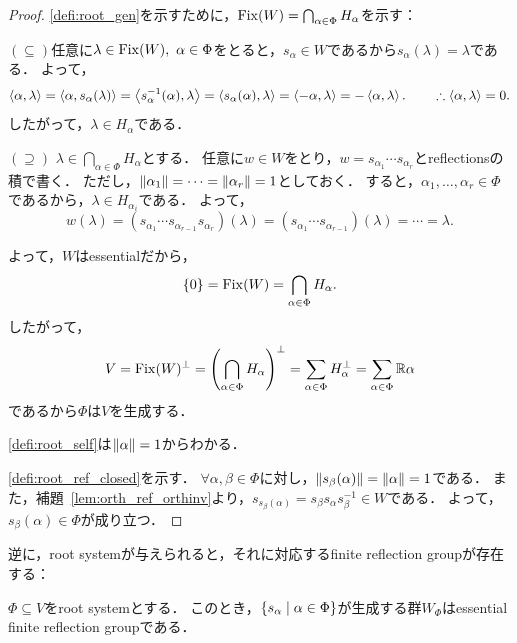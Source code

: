\begin{proof}
  \ref{defi:root_gen}を示すために，$\operatorname{Fix} (W) = \bigcap_{\alpha \in \Phi} H_\alpha$を示す：

  $(\subseteq)$任意に$\lambda \in \operatorname{Fix}(W),\ \alpha \in \Phi$をとると，$s_\alpha \in W$であるから$s_\alpha(\lambda) = \lambda$である．
  よって，
  \begin{equation}
    \left\langle \alpha, \lambda \right\rangle
    = \left\langle \alpha, s_\alpha(\lambda) \right\rangle
    = \left\langle s_\alpha^{-1}(\alpha), \lambda \right\rangle
    = \left\langle s_\alpha(\alpha), \lambda \right\rangle
    = \left\langle -\alpha, \lambda \right\rangle
    = -\left\langle \alpha, \lambda \right\rangle.
    \qquad \therefore \left\langle \alpha, \lambda \right\rangle = 0.
  \end{equation}
  したがって，$\lambda \in H_\alpha$である．

  $(\supseteq)$ $\lambda \in \bigcap_{\alpha \in \Phi} H_\alpha$とする．
  任意に$w \in W$をとり，$w = s_{\alpha_1} \cdots s_{\alpha_r}$とreflectionsの積で書く．
  ただし，$\left\| \alpha_1 \right\| = \cdots = \left\| \alpha_r \right\| = 1$としておく．
  すると，$\alpha_1, \ldots, \alpha_r \in \Phi$であるから，$\lambda \in H_{\alpha_i}$である．
  よって，
  \begin{equation}
    w(\lambda)
    = (s_{\alpha_1} \cdots s_{\alpha_{r-1}} s_{\alpha_r})(\lambda)
    = (s_{\alpha_1} \cdots s_{\alpha_{r-1}})(\lambda)
    = \cdots
    = \lambda.
  \end{equation}

  よって，$W$はessentialだから，
  \begin{equation}
    \{0\}
    = \operatorname{Fix}(W)
    = \bigcap_{\alpha \in \Phi} H_\alpha.
  \end{equation}
  したがって，
  \begin{equation}
    V
    = \operatorname{Fix}(W)^\perp
    = \left( \bigcap_{\alpha \in \Phi} H_\alpha \right)^\perp
    = \sum_{\alpha \in \Phi} H_\alpha^\perp
    = \sum_{\alpha \in \Phi} \mathbb{R}\alpha
  \end{equation}
  であるから$\Phi$は$V$を生成する．

  \ref{defi:root_self}は$\left\| \alpha \right\| = 1$からわかる．

  \ref{defi:root_ref_closed}を示す．
  $\forall \alpha, \beta \in \Phi$に対し，$\left\| s_\beta(\alpha) \right\| = \left\| \alpha \right\| = 1$である．
  また，補題~\ref{lem:orth_ref_orthinv}より，$s_{s_\beta(\alpha)} = s_\beta s_\alpha s_\beta^{-1} \in W$である．
  よって，$s_\beta(\alpha) \in \Phi$が成り立つ．
\end{proof}

逆に，root systemが与えられると，それに対応するfinite reflection groupが存在する：
\begin{proposition}
  $\Phi \subseteq V$をroot systemとする．
  このとき，$\left\lbrace s_\alpha \mathrel{} \middle| \mathrel{} \alpha \in \Phi \right\rbrace$が生成する群$W_\Phi$はessential finite reflection groupである．
\end{proposition}

